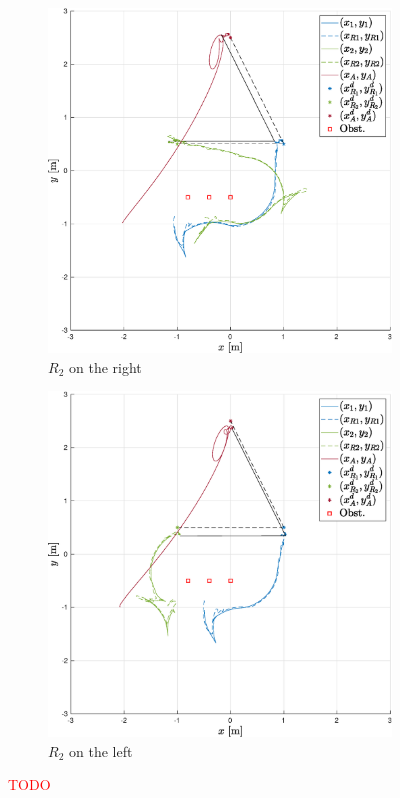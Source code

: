 \documentclass{ifacconf}
\begin{document}
\begin{figure}[h!]
    \centering
    \begin{subfigure}[b]{0.31\columnwidth}
        \centering
        \includegraphics[width=\linewidth]{images/experiment/static_obstacles/1st_scenario_obs_exp.eps}
        \caption{$R_2$ on the right}
    \end{subfigure}
    \begin{subfigure}[b]{0.31\columnwidth}
        \centering
        \includegraphics[width=\linewidth]{images/experiment/static_obstacles/1st_scenario_exp_obs_swap.eps}
        \caption{$R_2$ on the left}
    \end{subfigure}
    \vspace{-0.2cm}
    \caption{\textcolor{red}{TODO}}
\end{figure}
\end{document}
